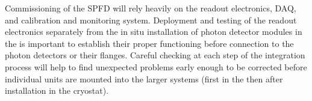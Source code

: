 


Commissioning of the SPFD  will rely heavily on the readout electronics, DAQ, and calibration and monitoring system.  Deployment and testing of the readout electronics separately from the in situ installation of photon detector modules in the  is important to establish their proper functioning before connection to the photon detectors or their flanges.  Careful checking at each step of the integration process will help to find unexpected problems early enough to be corrected before individual units are mounted into the larger systems (first in the  then after installation in the cryostat). 

